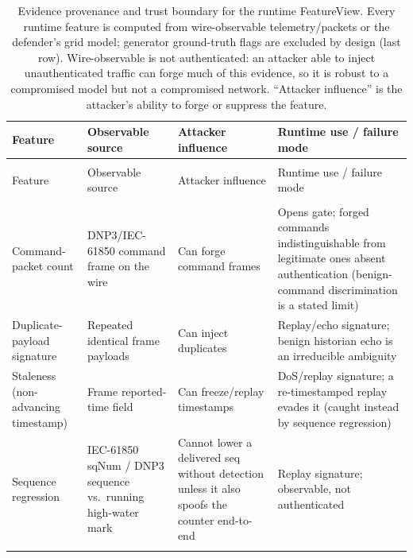 {\footnotesize
\begin{xltabular}{\textwidth}{@{}>{\raggedright\arraybackslash}p{0.19\textwidth}
 >{\raggedright\arraybackslash}p{0.22\textwidth}
 >{\raggedright\arraybackslash}p{0.13\textwidth}
 >{\raggedright\arraybackslash}X@{}}
\caption{Evidence provenance and trust boundary for the runtime FeatureView.
Every runtime feature is computed from wire-observable telemetry/packets or
the defender's grid model; generator ground-truth flags are excluded by design
(last row). Wire-observable is not authenticated: an attacker able to inject
unauthenticated traffic can forge much of this evidence, so it is robust to a
compromised model but not a compromised network. ``Attacker influence'' is the
attacker's ability to forge or suppress the feature.}\label{tab:provenance}\\
\toprule
Feature & Observable source & Attacker influence & Runtime use / failure mode \\
\midrule
\endfirsthead
{}\\[2pt]
\toprule
Feature & Observable source & Attacker influence & Runtime use / failure mode \\
\midrule
\endhead
\midrule
{}\\
\endfoot
\bottomrule
\endlastfoot
Command-packet count & DNP3/IEC-61850 command frame on the wire & Can forge command frames & Opens gate; forged commands indistinguishable from legitimate ones absent authentication (benign-command discrimination is a stated limit) \\
\addlinespace[2pt]
Duplicate-payload signature & Repeated identical frame payloads & Can inject duplicates & Replay/echo signature; benign historian echo is an irreducible ambiguity \\
\addlinespace[2pt]
Staleness (non-advancing timestamp) & Frame reported-time field & Can freeze/replay timestamps & DoS/replay signature; a re-timestamped replay evades it (caught instead by sequence regression) \\
\addlinespace[2pt]
Sequence regression & IEC-61850 sqNum / DNP3 sequence vs.\ running high-water mark & Cannot lower a delivered seq without detection unless it also spoofs the counter end-to-end & Replay signature; observable, not authenticated \\
\addlinespace[2pt]

\end{xltabular}}
